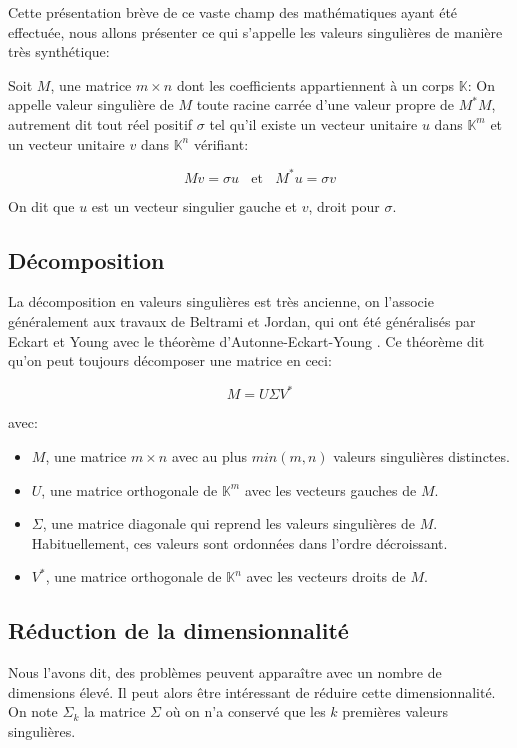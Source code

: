 Cette présentation brève de ce vaste champ des mathématiques ayant été effectuée, nous allons présenter ce qui s'appelle les valeurs singulières de manière très synthétique:

Soit $M$, une matrice $m \times n$ dont les coefficients appartiennent à un corps $\mathbb{K}$:
On appelle valeur singulière de $M$ toute racine carrée d'une valeur propre de $M^{*}M$, autrement dit tout réel positif $\sigma$ tel qu'il existe un vecteur unitaire $u$ dans $\mathbb{K}^{m}$ et un vecteur unitaire $v$ dans $\mathbb{K}^{n}$ vérifiant:

$$ Mv = \sigma u ~~~~ \text{et} ~~~~ M^{*}u = \sigma v $$

On dit que $u$ est un vecteur singulier gauche et $v$, droit pour $\sigma$.

\subsection{Décomposition}

La décomposition en valeurs singulières est très ancienne, on l'associe généralement aux travaux de Beltrami et Jordan, qui ont été généralisés par Eckart et Young avec le théorème d'Autonne-Eckart-Young \cite{eckart1939principal}. Ce théorème dit qu'on peut toujours décomposer une matrice en ceci:

$$ M = U \Sigma V^{*} $$

avec:
\begin{itemize}
  \item $M$, une matrice $m \times n$ avec au plus $min(m, n)$ valeurs singulières distinctes.
  \item $U$, une matrice orthogonale de $\mathbb{K}^{m}$ avec les vecteurs gauches de $M$.
  \item $\Sigma$, une matrice diagonale qui reprend les valeurs singulières de $M$. Habituellement, ces valeurs sont ordonnées dans l'ordre décroissant.
  \item $V^{*}$, une matrice orthogonale de $\mathbb{K}^{n}$ avec les vecteurs droits de $M$.
\end{itemize}

\subsection{Réduction de la dimensionnalité}

Nous l'avons dit, des problèmes peuvent apparaître avec un nombre de dimensions élevé. Il peut alors être intéressant de réduire cette dimensionnalité. On note $\Sigma_{k}$ la matrice $\Sigma$ où on n'a conservé que les $k$ premières valeurs singulières.

